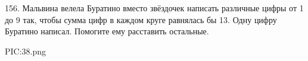 156. Мальвина велела Буратино вместо звёздочек написать различные цифры от 1 до 9 так, чтобы сумма цифр в каждом круге равнялась бы 13. Одну цифру Буратино написал. Помогите ему расставить остальные.
\begin{center}
{{PIC:38.png}}
\end{center}
